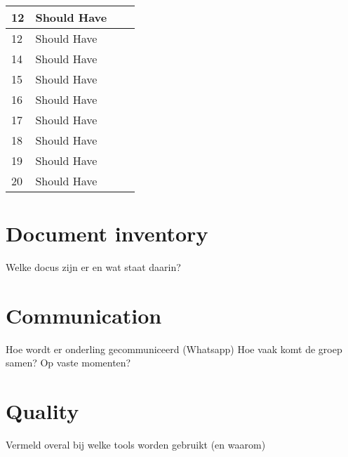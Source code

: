 \documentclass{article} %
\begin{document}
\begin{tabularx}{\textwidth}{|X|X|X|X|}
    12                   & Should Have                                    &                                                \\ \hline
    12                   & Should Have                                    &                                                \\ \hline
    14                   & Should Have                                    &                                                \\ \hline
    15                   & Should Have                                    &                                                \\ \hline
    16                   & Should Have                                    &                                                \\ \hline
    17                   & Should Have                                    &                                                \\ \hline
    18                   & Should Have                                    &                                                \\ \hline
    19                   & Should Have                                    &                                                \\ \hline
    20                   & Should Have                                    &                                                \\ \hline
\end{tabularx}
\label{tab:requirements}
\newpage

\section{Document inventory}
Welke docus zijn er en wat staat daarin?
\newpage

\section{Communication}
Hoe wordt er onderling gecommuniceerd (Whatsapp)
Hoe vaak komt de groep samen? Op vaste momenten?
\newpage

\section{Quality}
Vermeld overal bij welke tools worden gebruikt (en waarom)
\end{document}
